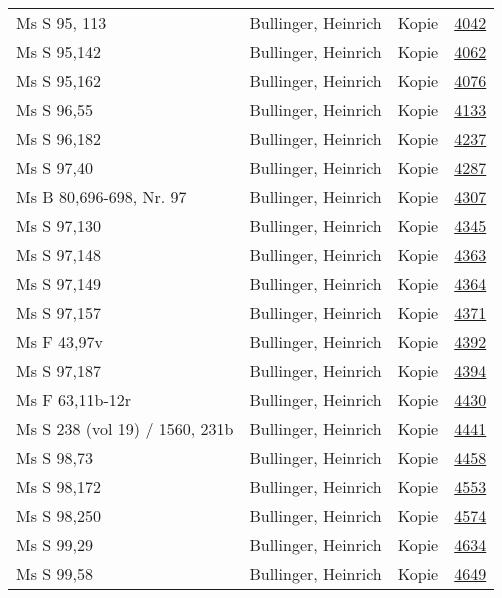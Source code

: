 \documentclass[10pt,a4paper,landscape]{report}
\begin{document}
\begin{longtable}{p{16cm}p{4cm}lr}
Ms S 95, 113	&	Bullinger, Heinrich	&	Kopie	&	\href{http://130.60.24.72/assignment/4042}{4042}\\
Ms S 95,142	&	Bullinger, Heinrich	&	Kopie	&	\href{http://130.60.24.72/assignment/4062}{4062}\\
Ms S 95,162	&	Bullinger, Heinrich	&	Kopie	&	\href{http://130.60.24.72/assignment/4076}{4076}\\
Ms S 96,55	&	Bullinger, Heinrich	&	Kopie	&	\href{http://130.60.24.72/assignment/4133}{4133}\\
Ms S 96,182	&	Bullinger, Heinrich	&	Kopie	&	\href{http://130.60.24.72/assignment/4237}{4237}\\
Ms S 97,40	&	Bullinger, Heinrich	&	Kopie	&	\href{http://130.60.24.72/assignment/4287}{4287}\\
Ms B 80,696-698, Nr. 97	&	Bullinger, Heinrich	&	Kopie	&	\href{http://130.60.24.72/assignment/4307}{4307}\\
Ms S 97,130	&	Bullinger, Heinrich	&	Kopie	&	\href{http://130.60.24.72/assignment/4345}{4345}\\
Ms S 97,148	&	Bullinger, Heinrich	&	Kopie	&	\href{http://130.60.24.72/assignment/4363}{4363}\\
Ms S 97,149	&	Bullinger, Heinrich	&	Kopie	&	\href{http://130.60.24.72/assignment/4364}{4364}\\
Ms S 97,157	&	Bullinger, Heinrich	&	Kopie	&	\href{http://130.60.24.72/assignment/4371}{4371}\\
Ms F 43,97v	&	Bullinger, Heinrich	&	Kopie	&	\href{http://130.60.24.72/assignment/4392}{4392}\\
Ms S 97,187	&	Bullinger, Heinrich	&	Kopie	&	\href{http://130.60.24.72/assignment/4394}{4394}\\
Ms F 63,11b-12r	&	Bullinger, Heinrich	&	Kopie	&	\href{http://130.60.24.72/assignment/4430}{4430}\\
Ms S 238 (vol 19) / 1560, 231b	&	Bullinger, Heinrich	&	Kopie	&	\href{http://130.60.24.72/assignment/4441}{4441}\\
Ms S 98,73	&	Bullinger, Heinrich	&	Kopie	&	\href{http://130.60.24.72/assignment/4458}{4458}\\
Ms S 98,172	&	Bullinger, Heinrich	&	Kopie	&	\href{http://130.60.24.72/assignment/4553}{4553}\\
Ms S 98,250	&	Bullinger, Heinrich	&	Kopie	&	\href{http://130.60.24.72/assignment/4574}{4574}\\
Ms S 99,29	&	Bullinger, Heinrich	&	Kopie	&	\href{http://130.60.24.72/assignment/4634}{4634}\\
Ms S 99,58	&	Bullinger, Heinrich	&	Kopie	&	\href{http://130.60.24.72/assignment/4649}{4649}\\

\end{longtable}
\end{document}
